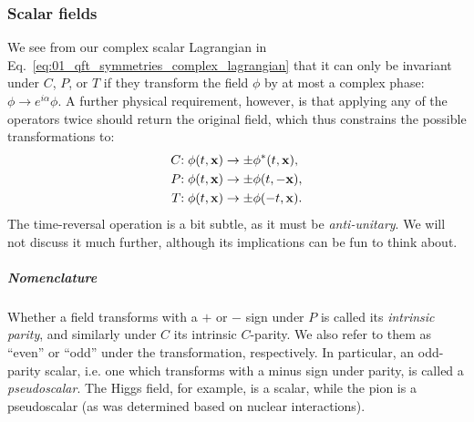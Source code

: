 


\subsubsection{Scalar fields}

We see from our complex scalar Lagrangian in Eq.~\ref{eq:01_qft_symmetries_complex_lagrangian} that it can only be invariant under $C$, $P$, or $T$ if they transform the field $\phi$ by at most a complex phase: $\phi \rightarrow e^{i\alpha}\phi$.
A further physical requirement, however, is that applying any of the operators twice should return the original field, which thus constrains the possible transformations to:
\begin{equation}
	\label{eq:01_qft_spinors_cpt_scalars}
	\begin{split}
		C\mathrm{:}\; \phi(t, \mathbf{x}) &\rightarrow \pm\phi^*(t, \mathbf{x}), \\
		P\mathrm{:}\; \phi(t, \mathbf{x}) &\rightarrow \pm\phi(t, -\mathbf{x}), \\
		T\mathrm{:}\; \phi(t, \mathbf{x}) &\rightarrow \pm\phi(-t, \mathbf{x}).
	\end{split}
\end{equation}
The time-reversal operation is a bit subtle, as it must be \textit{anti-unitary}.
We will not discuss it much further, although its implications can be fun to think about.

\subparagraph{Nomenclature} Whether a field transforms with a $+$ or $-$ sign under $P$ is called its \textit{intrinsic parity}, and similarly under $C$ its intrinsic $C$-parity.
We also refer to them as ``even'' or ``odd'' under the transformation, respectively.
In particular, an odd-parity scalar, i.e. one which transforms with a minus sign under parity, is called a \textit{pseudoscalar}.
The Higgs field, for example, is a scalar, while the pion is a pseudoscalar (as was determined based on nuclear interactions).

